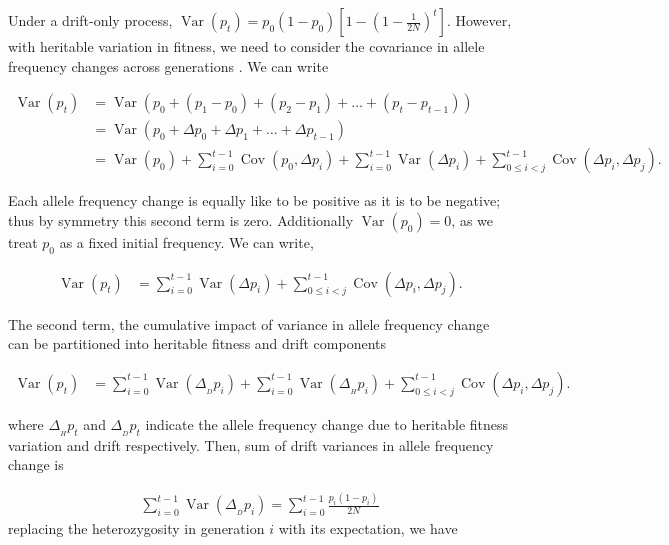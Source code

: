 \documentclass[11pt]{article}
\DeclareMathOperator{\var}{Var}
\DeclareMathOperator{\cov}{Cov}
\begin{document}
Under a drift-only process, $\var(p_t) = p_0(1-p_0)\left[1- \left(1 -
\frac{1}{2N}\right)^t\right]$. However, with heritable variation in fitness, we
need to consider the covariance in allele frequency changes across generations
\parencite{Buffalo2019-io}. We can write

\begin{align}
  \var(p_t) &= \var\left(p_0 + (p_1 - p_0) + (p_2 - p_1) + \ldots + (p_t - p_{t-1}) \right) \\
         &= \var\left(p_0 + \Delta p_0 + \Delta p_1 + \ldots + \Delta p_{t-1} \right) \\
         &= \var(p_0) + \sum_{i=0}^{t-1} \cov(p_0, \Delta p_i) + \sum_{i=0}^{t-1} \var(\Delta p_i) + \sum_{0 \le i < j}^{t-1} \cov(\Delta p_i, \Delta p_j).
\end{align}
%

Each allele frequency change is equally like to be positive as it is to be
negative; thus by symmetry this second term is zero. Additionally $\var(p_0) = 0$,
as we treat $p_0$ as a fixed initial frequency. We can write, 

\begin{align}
  \var(p_t) &= \sum_{i=0}^{t-1} \var(\Delta p_i) + \sum_{0 \le i < j}^{t-1} \cov(\Delta p_i, \Delta p_j).
\end{align}

The second term, the cumulative impact of variance in allele frequency change
can be partitioned into heritable fitness and drift components
\parencite{Santiago1995-hx,Buffalo2019-io}

\begin{align}
  \var(p_t) &= \sum_{i=0}^{t-1} \var(\Delta_{_D} p_i) + \sum_{i=0}^{t-1} \var(\Delta_{_H} p_i) + \sum_{0 \le i < j}^{t-1} \cov(\Delta p_i, \Delta p_j).
\end{align}

where $\Delta_{_H} p_t$ and $\Delta_{_D} p_t$ indicate the allele frequency
change due to heritable fitness variation and drift respectively. Then, sum of
drift variances in allele frequency change is

\begin{align}
  \sum_{i=0}^{t-1} \var(\Delta_{_D} p_i) = \sum_{i=0}^{t-1} \frac{p_i(1-p_i)}{2N}
\end{align}
%
replacing the heterozygosity in generation $i$ with its expectation, we have
\end{document}
